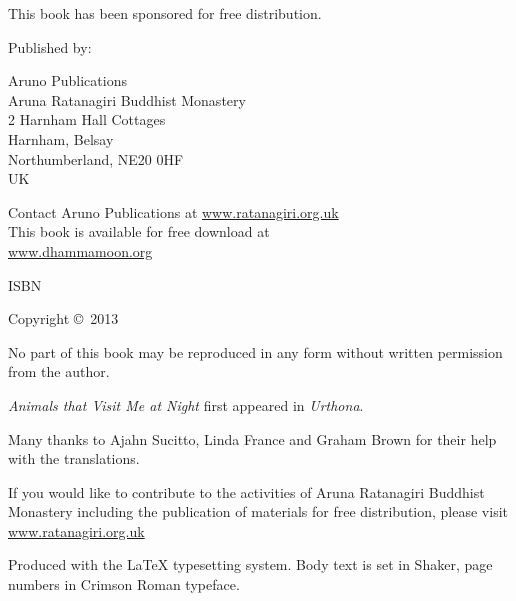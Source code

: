 
\cleartoverso
\thispagestyle{empty}

{\small\setlength{\parskip}{0.8em}\setlength{\parindent}{0em}%
{\raggedright%

This book has been sponsored for free distribution.

Published by:

Aruno Publications\\
Aruna Ratanagiri Buddhist Monastery\\
2 Harnham Hall Cottages\\
Harnham, Belsay\\
Northumberland, NE20 0HF\\
UK

Contact Aruno Publications at \href{http://ratanagiri.org.uk}{www.ratanagiri.org.uk}\\
This book is available for free download at\\
\href{http://dhammamoon.org/}{www.dhammamoon.org}

ISBN \theISBN

Copyright \copyright\ 2013 \theauthor

No part of this book may be reproduced in any form without written permission from the author.

\vfill

\textit{Animals that Visit Me at Night} first appeared in \textit{Urthona}.

Many thanks to Ajahn Sucitto, Linda France and Graham Brown for their help with the translations.

If you would like to contribute to the activities of Aruna Ratanagiri Buddhist Monastery including the publication of materials for free distribution, please visit \href{http://ratanagiri.org.uk/}{www.ratanagiri.org.uk}

{\footnotesize
Produced with the {\selectfont\LaTeX} typesetting system. Body text is set in Shaker, page numbers in Crimson Roman typeface.

\theEditionInfo

}

}}

